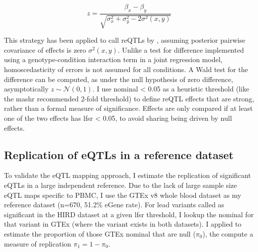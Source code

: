 \begin{equation}
z = \frac{\beta_x - \beta_y}{\sqrt{\sigma_x^2 + \sigma_y^2 - 2\sigma^2(x, y)}}
\end{equation}

This strategy has been applied to call reQTLs by \autocite{kim-hellmuth2017GeneticRegulatoryEffects},
assuming posterior pairwise covariance of effects is zero $\sigma^2(x, y)$.
Unlike a test for difference implemented using a genotype-condition interaction term in a joint regression model, homoscedasticity of errors is not assumed for all conditions\autocite{clogg1995StatisticalMethodsComparing}.
A Wald test \pvalue for the difference can be computed, as under the null hypothesis of zero difference, asymptotically $z \sim \mathcal{N}(0, 1)$.
I use nominal \pvalue < 0.05 as a heuristic threshold (like the mashr recommended 2-fold threshold) to define reQTL effects that are strong, rather than a formal measure of significance.
Effects are only compared if at least one of the two effects has lfsr < 0.05, to avoid sharing being driven by null effects.

\subsection{Replication of eQTLs in a reference dataset}

To validate the \gls{eQTL} mapping approach, I estimate the replication of significant eQTLs in a large independent reference.
Due to the lack of large sample size \gls{eQTL} maps specific to \gls{PBMC}, I use the GTEx v8 whole blood dataset as my reference dataset (n=670, 51.2\% eGene rate).
For lead variants called as significant in the \gls{HIRD} dataset at a given lfsr threshold, I lookup the nominal \pvalue for that variant in GTEx (where the variant exists in both datasets).
I applied  to estimate the proportion of those GTEx nominal \pvalues that are null ($\pi_0$), the compute a measure of replication $\pi_1 = 1 - \pi_0$.

